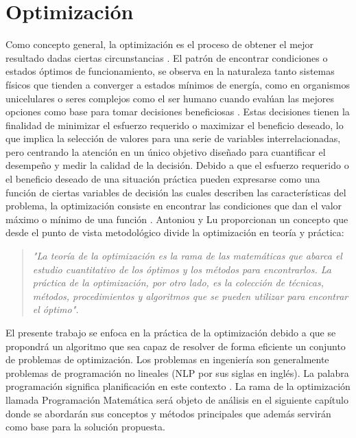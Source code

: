 
\chapter{Optimización} %

\label{Chapter2} %

Como concepto general, la optimización es el proceso de obtener el mejor resultado dadas ciertas circunstancias \cite{rao_engineering_2009}. El patrón de encontrar condiciones o estados óptimos de funcionamiento, se observa en la naturaleza tanto  sistemas físicos que tienden a converger a estados mínimos de energía, como en organismos unicelulares o seres complejos como el ser humano cuando evalúan las mejores opciones como base para tomar decisiones beneficiosas \cite{nocedal2006numerical}. Estas decisiones tienen la finalidad de minimizar el esfuerzo requerido o maximizar el beneficio deseado, lo que implica la selección de valores para una serie de variables interrelacionadas, pero centrando la atención en un único objetivo diseñado para cuantificar el desempeño y medir la calidad de la decisión. Debido a que el esfuerzo requerido o el beneficio deseado de una situación práctica pueden expresarse como una función de ciertas variables de decisión las cuales describen las características del problema, la optimización consiste en encontrar las condiciones que dan el valor máximo o mínimo de una función \cite{rao_engineering_2009}. Antoniou y Lu \cite{antoniou_practical_2007} proporcionan un concepto que desde el punto de vista metodológico divide la optimización en teoría y práctica:

\begin{quote}
\textit{"La teoría de la optimización es la rama de las matemáticas que abarca el estudio cuantitativo de los óptimos y los métodos para encontrarlos. La práctica de la optimización, por otro lado, es la colección de técnicas, métodos, procedimientos y algoritmos que se pueden utilizar para encontrar el óptimo".}
\end{quote}
El presente trabajo se enfoca en la práctica de la optimización debido a que se propondrá un algoritmo que sea capaz de resolver de forma eficiente un conjunto de problemas de optimización. Los problemas en ingeniería son generalmente problemas de programación no lineales (NLP por sus siglas en inglés). La palabra programación significa planificación en este contexto \cite{belegundu_optimization_2011}. La rama de la optimización llamada Programación Matemática será objeto de análisis en el siguiente capítulo donde se abordarán sus conceptos y métodos principales que además servirán como base para la solución propuesta. 

